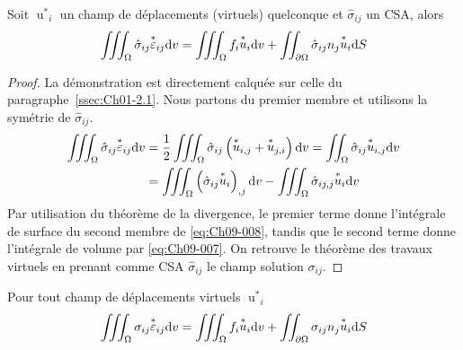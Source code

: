 \begin{lem}
    Soit ${\mathop{u}^{\ast}}_i$ un champ de déplacements (virtuels) quelconque et $\hat{\sigma}_{ij}$ un CSA, alors
    \begin{equation}
        \iiint_{\Omega} \hat{\sigma}_{ij} {\mathop{\varepsilon}^{\ast}}_{ij} \mathrm{d} v = \iiint_{\Omega} f_{i} {\mathop{u}^{\ast}}_i \mathrm{d} v + \iint_{\partial \Omega} \hat{\sigma}_{ij} n_j {\mathop{u}^{\ast}}_i \mathrm{d} S
        \label{eq:Ch09-008}
    \end{equation}
\end{lem}
\begin{proof}
    La  démonstration  est directement calquée sur celle du paragraphe~\ref{ssec:Ch01-2.1}.
    Nous partons du premier membre et utilisons la symétrie de $\hat{\sigma}_{ij}$.
    \begin{align*}
        \iiint_{\Omega} \hat{\sigma}_{ij} {\mathop{\varepsilon}^{\ast}}_{ij} \mathrm{d} v &= \frac{1}{2} \iiint_{\Omega} \hat{\sigma}_{ij} \left( {\mathop{u}^{\ast}}_{i,j} + {\mathop{u}^{\ast}}_{j,i}  \right) \mathrm{d} v = \iint_{\Omega} \hat{\sigma}_{ij} {\mathop{u}^{\ast}}_{i,j} \mathrm{d} v \\
        & = \iiint_{\Omega} \left( \hat{\sigma}_{ij} {\mathop{u}^{\ast}}_{i} \right)_{,j} \mathrm{d} v - \iiint_{\Omega} \hat{\sigma}_{ij,j}  {\mathop{u}^{\ast}}_{i} \mathrm{d} v
    \end{align*}
    Par utilisation du théorème de la divergence, le premier terme donne l'intégrale de surface du second membre de \eqref{eq:Ch09-008}, tandis que le second terme donne l'intégrale de volume par \eqref{eq:Ch09-007}.
    On retrouve le théorème des travaux virtuels en prenant comme CSA $\hat{\sigma}_{ij}$ le champ solution $\sigma_{ij}$.
\end{proof}

\begin{thm}
    Pour tout champ de déplacements virtuels ${\mathop{u}^{\ast}}_{i}$
    \begin{equation}
        \iiint_{\Omega} \sigma_{ij} {\mathop{\varepsilon}^{\ast}}_{ij} \mathrm{d} v = \iiint_{\Omega} f_i {\mathop{u}^{\ast}}_i \mathrm{d} v + \iint_{\partial \Omega} \sigma_{ij} n_j {\mathop{u}^{\ast}}_i \mathrm{d} S
        \label{eq:Ch09-009}
    \end{equation}
\end{thm}

